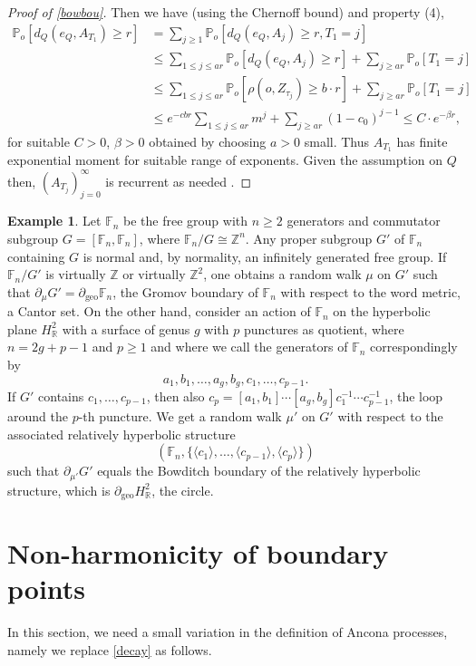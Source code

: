 \documentclass[12pt,a4paper]{amsart}
\numberwithin{equation}{section}
\theoremstyle{definition}
\newtheorem{exa}[equation]{Example}
\DeclareMathOperator{\geo}{geo}
\def\F{\mathbb F}
\def\p{\mathbb P}
\def\R{\mathbb R}
\def\Z{\mathbb Z}
\def\la{\langle}
\def\ra{\rangle}
\begin{document}
\begin{proof}[Proof of \cref{bowbou}]
Then we have (using the Chernoff bound) and property (4),
{\allowdisplaybreaks
\begin{align*}
\p_o[d_Q(e_Q,A_{T_1})\geq r]&=\sum_{j\ge 1} \p_o[d_Q(e_Q,A_j)\geq r, T_1=j]\\
&\leq \sum_{1\leq  j\leq ar}\p_o[d_Q(e_Q,A_j)\geq r] + \sum_{j\geq ar} \p_o[T_1=j] \\
& \leq \sum_{1\leq j\leq ar}\p_o[\rho(o,Z_{\tau_j})\geq b\cdot r] + \sum_{j\geq ar} \p_o[T_1=j]\\
&\leq  e^{-cbr}\sum_{1\leq j\leq ar} m^{j} + \sum_{j\geq ar} (1-c_0)^{j -1} \leq C\cdot e^{-\beta r},
\end{align*}}
for suitable $C>0$, $\beta>0$ obtained by choosing $a>0$ small. Thus $A_{T_1}$ has finite exponential moment for suitable range of exponents. Given the assumption on $Q$ then, $(A_{T_j})_{j=0}^\infty$ is recurrent as needed \cite[T1 on p.\,83]{Spi}. 
\end{proof}

\begin{exa}
Let $\F_n$ be the free group with $n\ge2$ generators and commutator subgroup $G=[\F_n,\F_n]$, where $\F_n/G\cong\Z^n$.
Any proper subgroup $G'$ of $\F_n$ containing $G$ is normal
and, by normality, an infinitely generated free group.
If $\F_n/G'$ is virtually $\Z$ or virtually $\Z^2$, one obtains a random walk $\mu$ on $G'$ such that $\partial_\mu G'=\partial_{\geo}\mathbb{F}_n$, the Gromov boundary of $\mathbb{F}_n$ with respect to the word metric, a Cantor set.
On the other hand, consider an action of $\F_n$ on the hyperbolic plane $H_\R^2$ with a surface of genus $g$ with $p$ punctures as quotient, where $n=2g+p-1$ and $p\ge1$ and where we call the generators of $\F_n$ correspondingly by \[a_1,b_1,\dots,a_g,b_g,c_1,\dots,c_{p-1}.\]
If $G'$ contains $c_1,\dots,c_{p-1}$,
then also $c_p=[a_1,b_1]\cdots[a_g,b_g]c_1^{-1}\cdots c_{p-1}^{-1}$, the loop around the $p$-th puncture.
We get a random walk $\mu'$ on $G'$ with respect to the associated relatively hyperbolic structure 
\[ (\F_n,\{\la c_1\ra,\dots,\la c_{p-1}\ra,\la c_p\ra\}) \]
such that $\partial_{\mu'}G'$ equals the Bowditch boundary of the relatively hyperbolic structure,
which is $\partial_{\geo}H_\R^2$, the circle.
\end{exa} 

\section{Non-harmonicity of boundary points}\label{secsem}
In this section, we need a small variation in the definition of Ancona processes, namely we replace \ref{decay} as follows.
\end{document}

